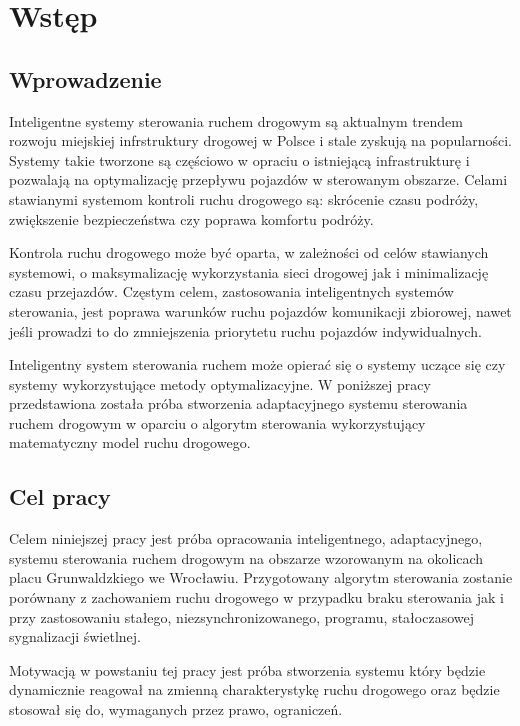 \chapter{Wstęp}
\section{Wprowadzenie}
Inteligentne systemy sterowania ruchem drogowym są aktualnym trendem rozwoju miejskiej infrstruktury drogowej w Polsce i stale zyskują na popularności.
Systemy takie tworzone są częściowo w opraciu o istniejącą infrastrukturę i pozwalają na optymalizację przepływu pojazdów w sterowanym obszarze.
Celami stawianymi systemom kontroli ruchu drogowego są: skrócenie czasu podróży, zwiększenie bezpieczeństwa czy poprawa komfortu podróży.

Kontrola ruchu drogowego może być oparta, w zależności od celów stawianych systemowi, o maksymalizację wykorzystania sieci drogowej jak i minimalizację czasu przejazdów. Częstym celem, zastosowania inteligentnych systemów sterowania, jest poprawa warunków ruchu pojazdów komunikacji zbiorowej, nawet jeśli prowadzi to do zmniejszenia priorytetu ruchu pojazdów indywidualnych.

Inteligentny system sterowania ruchem może opierać się o systemy uczące się czy systemy wykorzystujące metody optymalizacyjne. W poniższej pracy przedstawiona została próba stworzenia adaptacyjnego systemu sterowania ruchem drogowym w oparciu o algorytm sterowania wykorzystujący matematyczny model ruchu drogowego.

\section{Cel pracy}
Celem niniejszej pracy jest próba opracowania inteligentnego, adaptacyjnego, systemu sterowania ruchem drogowym na obszarze wzorowanym na okolicach placu Grunwaldzkiego we Wrocławiu. Przygotowany algorytm sterowania zostanie porównany z zachowaniem ruchu drogowego w przypadku braku sterowania jak i przy zastosowaniu stałego, niezsynchronizowanego, programu, stałoczasowej sygnalizacji świetlnej.

Motywacją w powstaniu tej pracy jest próba stworzenia systemu który będzie dynamicznie reagował na zmienną charakterystykę ruchu drogowego oraz będzie stosował się do, wymaganych przez prawo, ograniczeń.